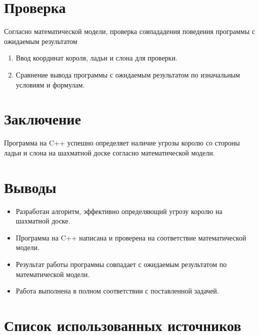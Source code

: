 \documentclass{article}
\begin{document}
\section{Проверка}

Согласно математической модели, проверка совпададения поведения программы с ожидаемым результатом 

\begin{enumerate}
    \item Ввод координат короля, ладьи и слона для проверки.
    \item Сравнение вывода программы с ожидаемым результатом по изначальным условиям и формулам.
\end{enumerate}


\section{Заключение}

Программа на C++ успешно определяет наличие угрозы королю со стороны ладьи и слона на шахматной доске согласно математической модели.


\section{Выводы}


\begin{itemize}
    \item Разработан алгоритм, эффективно определяющий угрозу королю на шахматной доске.
    \item Программа на C++ написана и проверена на соответствие математической модели.
    \item Результат работы программы совпадает с ожидаемым результатом по математической модели.
    \item Работа выполнена в полном соответствии с поставленной задачей.
\end{itemize}

\section{Список использованных источников}



\nocite{*} 
\end{document}
